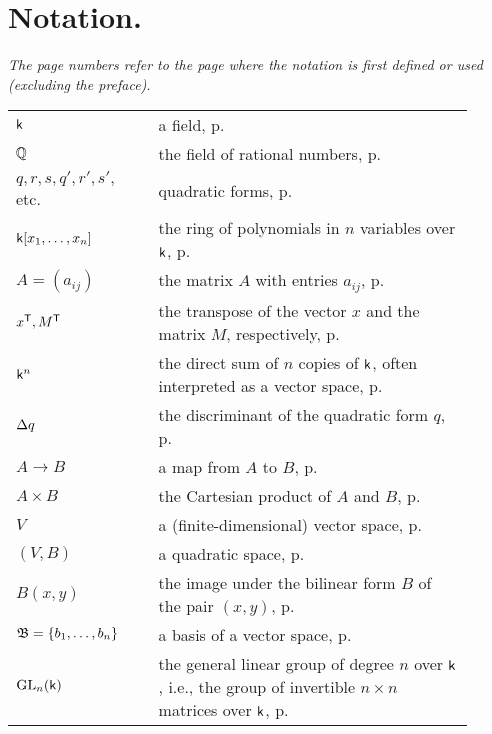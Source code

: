 \chapter*{Notation.}

{\itshape\quad The page numbers refer to the page where the notation is first defined or used (excluding the preface).}

\begin{longtable}{p{0.25\linewidth} p{0.01\linewidth} p{0.65\linewidth}}
    \(\mathsf{k}\) && a field, p.\,\pageref{sec:quadratic-forms}\\
    \(\mathbb{Q}\) && the field of rational numbers, p.\,\pageref{sec:quadratic-forms}\\
    \(q, r, s, q', r', s',\) etc. && quadratic forms, p.\,\pageref{sec:quadratic-forms}\\
    \(\mathsf{k}[x_1, \dots, x_n]\) && the ring of polynomials in \(n\) variables over \(\mathsf{k}\), p.\,\pageref{sec:quadratic-forms}\\
    \(A = (a_{ij})\) && the matrix \(A\) with entries \(a_{ij}\), p.\,\pageref{sec:quadratic-forms-matrix-representation}\\
    \(x^{\mathsf{T}}, M^{\mathsf{T}}\) && the transpose of the vector \(x\) and the matrix \(M\), respectively, p.\,\pageref{sec:quadratic-forms-matrix-representation}\\
    \(\mathsf{k}^n\) && the direct sum of \(n\) copies of \(\mathsf{k}\), often interpreted as a vector space, p.\,\pageref{sec:quadratic-forms-matrix-representation}\\
    \({\Delta} q\) && the discriminant of the quadratic form \(q\), p.\,\pageref{sec:quadratic-forms-matrix-representation}\\
    \(A \to B\) && a map from \(A\) to \(B\), p.\,\pageref{sec:quadratic-maps}\\
    \(A \times B\) && the Cartesian product of \(A\) and \(B\), p.\,\pageref{sec:quadratic-maps}\\
    \(V\) && a (finite-dimensional) vector space, p.\,\pageref{sec:quadratic-maps}\\
    \((V, B)\) && a quadratic space, p.\,\pageref{sec:quadratic-maps}\\
    \(B(x, y)\) && the image under the bilinear form \(B\) of the pair \((x, y)\), p.\,\pageref{sec:quadratic-forms-basis}\\
    \(\mathfrak{B} = \{b_1, \dots, b_n\}\) && a basis of a vector space, p.\,\pageref{sec:quadratic-forms-basis}\\
    \(\mathrm{GL}_{n}(\mathsf{k})\) && the general linear group of degree \(n\) over \(\mathsf{k}\), i.e., the group of invertible \(n \times n\) matrices over \(\mathsf{k}\), p.\,\pageref{sec:quadratic-space-change-of-basis}\\

\end{longtable}
